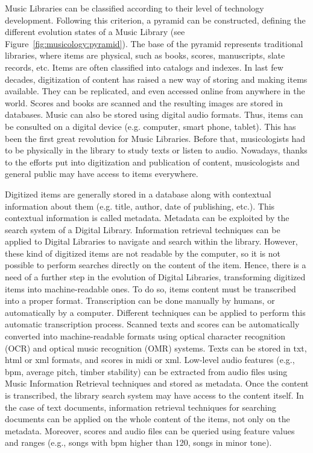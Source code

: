 Music Libraries can be classified according to their level of technology development. Following this criterion, a pyramid can be constructed, defining the different evolution states of a Music Library (see Figure~\ref{fig:musicology:pyramid}). The base of the pyramid represents traditional libraries, where items are physical, such as books, scores, manuscripts, slate records, etc. Items are often classified into catalogs and indexes. In last few decades, digitization of content has raised a new way of storing and making items available. They can be replicated, and even accessed online from anywhere in the world. Scores and books are scanned and the resulting images are stored in databases. Music can also be stored using digital audio formats. Thus, items can be consulted on a digital device (e.g. computer, smart phone, tablet). This has been the first great revolution for Music Libraries. Before that, musicologists had to be physically in the library to study texts or listen to audio. Nowadays, thanks to the efforts put into digitization and publication of content, musicologists and general public may have access to items everywhere.

Digitized items are generally stored in a database along with contextual information about them (e.g. title, author, date of publishing, etc.). This contextual information is called metadata. Metadata can be exploited by the search system of a Digital Library. Information retrieval techniques can be applied to Digital Libraries to navigate and search within the library. However, these kind of digitized items are not readable by the computer, so it is not possible to perform searches directly on the content of the item. Hence, there is a need of a further step in the evolution of Digital Libraries, transforming digitized items into machine-readable ones. To do so, items content must be transcribed into a proper format. Transcription can be done manually by humans, or automatically by a computer. Different techniques can be applied to perform this automatic transcription process. Scanned texts and scores can be automatically converted into machine-readable formats using optical character recognition (OCR) and optical music recognition (OMR) systems. Texts can be stored in txt, html or xml formats, and scores in midi or xml. Low-level audio features (e.g., bpm, average pitch, timber stability) can be extracted from audio files using Music Information Retrieval techniques and stored as metadata. Once the content is transcribed, the library search system may have access to the content itself. In the case of text documents, information retrieval techniques for searching documents can be applied on the whole content of the items, not only on the metadata. Moreover, scores and audio files can be queried using feature values and ranges (e.g., songs with bpm higher than 120, songs in minor tone). 

